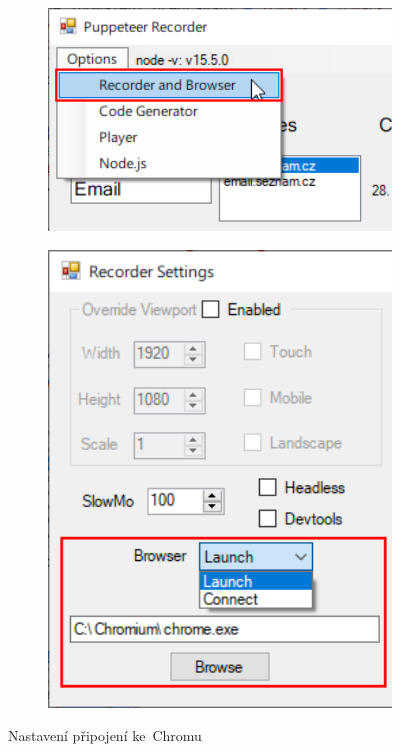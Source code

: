 \documentclass[12pt, a4paper, twoside]{article}
\begin{document}
	\begin{figure}[H]
		\centering
		\begin{minipage}{0.49\textwidth}
			\begin{subfigure}[t]{1.0\textwidth}
				\includegraphics[width=1.0\textwidth]{recorderSettingsMenuItem.png}
			\end{subfigure}	
		\end{minipage}
		\hfill
		\textrightarrow
		\hfill
		\begin{minipage}{0.45\textwidth}
			\begin{subfigure}[t]{1.0\textwidth}
				\includegraphics[width=1.0\textwidth, right]{chromeConnection.png}
			\end{subfigure}	
		\end{minipage}
		\caption{Nastavení připojení ke~Chromu}
		\label{fig:chromeConnection}
	\end{figure}
\end{document}
